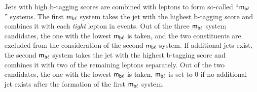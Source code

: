 Jets with high b-tagging scores are combined with leptons to form so-called ``$\textsf{m}_{\textsf{b}\ell}$'' systems. The first $\textsf{m}_{\textsf{b}\ell}$ system takes the jet with the highest b-tagging score and combines it with each \emph{tight} lepton in events. Out of the three $\textsf{m}_{\textsf{b}\ell}$ system candidates, the one with the lowest $\textsf{m}_{\textsf{b}\ell}$ is taken, and the two constituents are excluded from the consideration of the second $\textsf{m}_{\textsf{b}\ell}$ system. If additional jets exist, the second $\textsf{m}_{\textsf{b}\ell}$ system takes the jet with the highest b-tagging score and combines it with two of the remaining leptons separately. Out of the two candidates, the one with the lowest $\textsf{m}_{\textsf{b}\ell}$ is taken. $\textsf{m}_{\textsf{b}\ell}$ is set to 0 if no additional jet exists after the formation of the first $\textsf{m}_{\textsf{b}\ell}$ system.